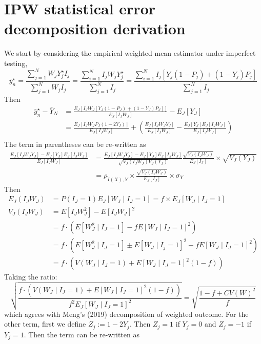 \documentclass[12pt]{amsart}
\numberwithin{equation}{section}
\theoremstyle{plain}
\begin{document}
\section{IPW statistical error decomposition derivation}
\label{app:ipwderivation}
We start by considering the empirical weighted mean estimator under imperfect testing,
$$
\bar y_n^\star = \frac{\sum_{j=1}^N W_j Y_j^\star I_j}{\sum_{j=1}^N W_j I_j} = \frac{\sum_{i=1}^N  I_j W_j Y_j^\star }{\sum_{j=1}^N  I_j } = \frac{\sum_{i=1}^N  I_j \left[ Y_j (1-P_j) + (1-Y_j) P_j \right]}{\sum_{j=1}^N  I_j }
$$
Then
$$
\begin{aligned}
\bar y_n^\star  - \bar Y_N &= \frac{E_J \left[ I_J W_J \left[ Y_J (1-P_J) + (1-Y_J) P_J \right] \right]}{E_J [ I_J W_J ] } - E_J[Y_J] \\
&= \frac{E_J \left[ I_J W_J P_J (1-2Y_J) \right]}{E_J [ I_J W_J ] } + \left( \frac{E_J [I_J W_J Y_J]}{E_J [ I_J W_J ] } - \frac{E_J[Y_J] E_J[I_J W_J]}{E_J[I_J W_J]} \right) \\
\end{aligned}
$$
The term in parentheses can be re-written as
$$
\begin{aligned}
\frac{E_J [I_J W_J Y_J]- E_J[Y_J] E_J[I_J W_J]}{E_J[I_J W_J]} &=  \frac{E_J [I_J W_J Y_J]- E_J[Y_J] E_J[I_J W_J]}{\sqrt{V_J(I_J W_J) V_J(Y_J)}} \frac{\sqrt{V_J(I_J W_J)}}{E_J[I_J]} \times \sqrt{V_J(Y_J)} \\
&= \rho_{\tilde I (X),Y} \times \frac{\sqrt{V_J(I_J W_J)}}{E_J[I_J]} \times \sigma_Y
\end{aligned}
$$
Then
\begin{align*}
E_J (I_J W_J) &= P(I_J = 1) E_J [W_J \mid I_J = 1] = f \times E_J [W_J \mid I_J = 1] \\
V_J(I_J W_J) &= E[ I_J W_J^2] - E[I_J W_J]^2 \\
&= f \cdot \left( E [W_J^2 \mid I_J = 1] - f E[W_J \mid I_J = 1 ]^2 \right) \\
&= f \cdot \left( E [W_J^2 \mid I_J = 1] \pm E[W_J \mid I_j = 1]^2 - f E[W_J \mid I_J = 1 ]^2 \right) \\
&= f \cdot \left( V (W_J \mid I_J = 1) + E[W_J \mid I_J = 1]^2 (1-f) \right)
\end{align*}
Taking the ratio:
$$
\sqrt{\frac{f \cdot \left( V (W_J \mid I_J = 1) + E[W_J \mid I_J = 1]^2 (1-f) \right)}{f^2 E_J [W_J \mid I_J = 1]^2}} = \sqrt{\frac{1 - f + CV(W)^2}{f}}
$$
which agrees with Meng's (2019) decomposition of weighted outcome. For the other term, first we define $Z_j := 1 - 2 Y_j $. Then $Z_j = 1$ if $Y_j = 0$ and $Z_j = -1$ if $Y_j = 1$. Then the term can be re-written as
\end{document}
